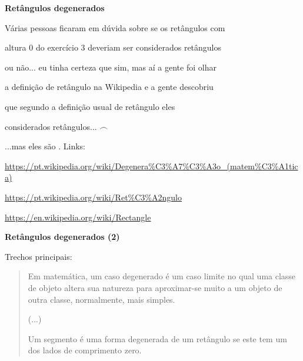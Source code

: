 \documentclass[oneside,12pt]{article}
\begin{document}

{\bf Retângulos degenerados}

\ssk

Várias pessoas ficaram em dúvida sobre se os retângulos com

altura 0 do exercício 3 deveriam ser considerados retângulos

ou não... eu tinha certeza que sim, mas aí a gente foi olhar

a definição de retângulo na Wikipedia e a gente descobriu

que segundo a definição usual de retângulo eles 

considerados retângulos... $\frown$

\msk

...mas eles são . Links:

\ssk

{\scriptsize

\url{https://pt.wikipedia.org/wiki/Degenera%C3%A7%C3%A3o_(matem%C3%A1tica)}

\url{https://pt.wikipedia.org/wiki/Ret%C3%A2ngulo}

\url{https://en.wikipedia.org/wiki/Rectangle}

}

\newpage


{\bf Retângulos degenerados (2)}

\ssk

Trechos principais:

\begin{quotation}

Em matemática, um caso degenerado é um caso li\-mite no qual uma
classe de objeto altera sua natureza para aproximar-se muito a um
objeto de outra classe, normal\-mente, mais simples.

\msk

(...)

\msk

Um segmento é uma forma degenerada de um retângulo se este tem um dos
lados de comprimento zero.

\end{quotation}
\end{document}
